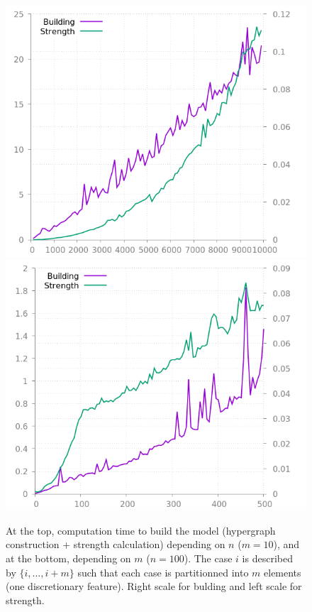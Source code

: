 \documentclass[sigconf,edbt]{acmart-edbt-workshops}
\begin{document}
\begin{figure}[!h]
\centering
\includegraphics[scale=0.35]{img/time_k.png}
\hfill
\includegraphics[scale=0.35]{img/time_n_old.png}
\caption{At the top, computation time to build the model (hypergraph construction + strength calculation) depending on $n$ ($m = 10$), and at the bottom, depending on $m$ ($n = 100$). The case $i$ is described by $\{i, ...,  i+m\}$ such that each case is partitionned into $m$ elements (one discretionary feature). Right scale for bulding and left scale for strength.}
\label{fig:time}
\end{figure}
\end{document}

